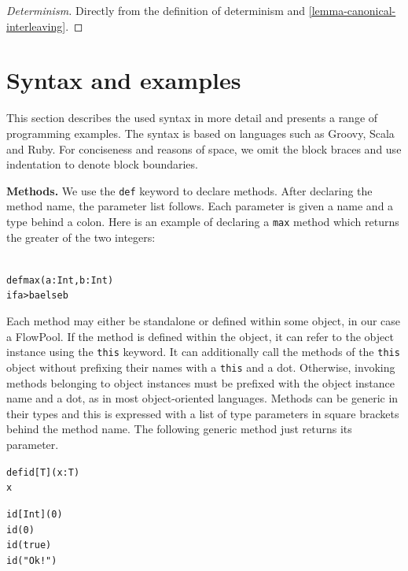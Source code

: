 \documentclass[runningheads,a4paper]{llncs}
\begin{document}
\begin{proof}[Determinism]
Directly from the definition of determinism and
\ref{lemma-canonical-interleaving}.
\end{proof}




\section{Syntax and examples}
\label{sec:syntax-examples}

This section describes the used syntax in more detail and presents a range of programming
examples.
The syntax is based on languages such as Groovy, Scala and Ruby.
For conciseness and reasons of space, we omit the block braces and use indentation
to denote block boundaries.

\textbf{Methods.}
We use the \verb=def= keyword to declare methods.
After declaring the method name, the parameter list follows.
Each parameter is given a name and a type behind a colon.
Here is an example of declaring a \verb=max= method which returns the greater
of the two integers:

\begin{minipage}[b]{3.75 cm}
\begin{alltt}
{\scriptsize
def max(a: Int, b: Int)
  if a > b a else b
}
\end{alltt}
\end{minipage}


Each method may either be standalone or defined within some object, in our case
a FlowPool.
If the method is defined within the object, it can refer to the object instance
using the \verb=this= keyword.
It can additionally call the methods of the \verb=this= object without prefixing
their names with a \verb=this= and a dot.
Otherwise, invoking methods belonging to object instances must be prefixed with
the object instance name and a dot, as in most object-oriented languages.
Methods can be generic in their types and this is expressed with a list of
type parameters in square brackets behind the method name.
The following generic method just returns its parameter.

\begin{minipage}[b]{3.75 cm}
\begin{alltt}
{\scriptsize
def id[T](x: T)
  x

id[Int](0)
id(0)
id(true)
id("Ok!")
}
\end{alltt}
\end{minipage}
\end{document}
